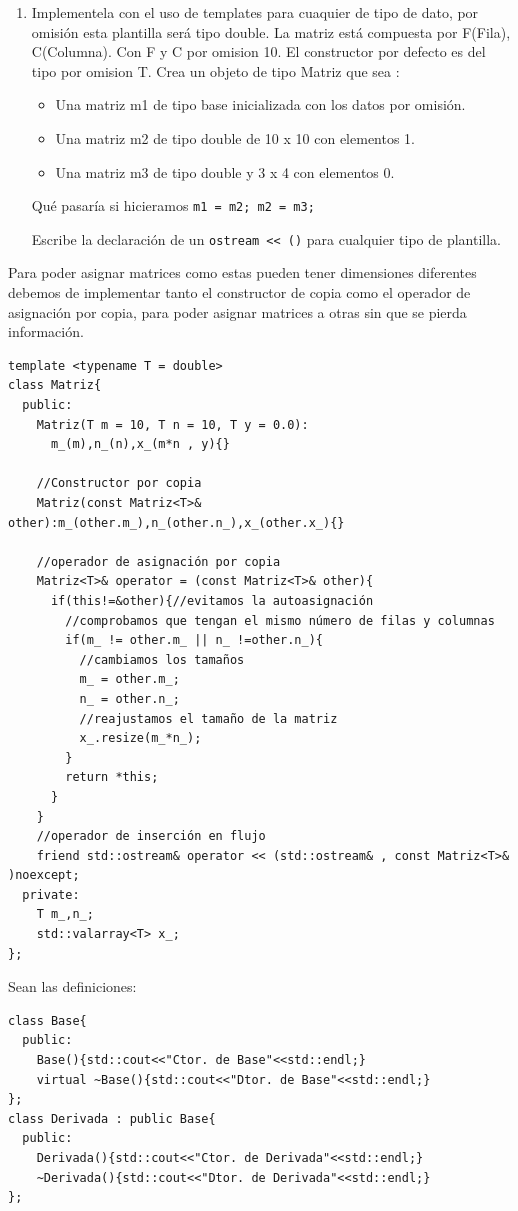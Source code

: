 \begin{enumerate}
  \item Implementela con el uso de templates para cuaquier de tipo de dato, por omisión esta plantilla será tipo double. La matriz está compuesta por F(Fila), C(Columna). Con F y C por omision 10. El constructor por defecto es del tipo por omision T. Crea un objeto de tipo Matriz que sea :
  \begin{itemize}
    \item Una matriz m1 de tipo base inicializada con los datos por omisión.
    \item Una matriz m2 de tipo double de 10 x 10 con elementos 1.
    \item Una matriz m3 de tipo double y 3 x 4 con elementos 0.
  \end{itemize}
  Qué pasaría si hicieramos \texttt{m1 = m2; m2 = m3; }

  Escribe la declaración de un \texttt{ostream << ()} para cualquier tipo de plantilla.
\end{enumerate} 

Para poder asignar matrices como estas pueden tener dimensiones diferentes debemos de implementar tanto el constructor de copia como el operador de asignación por copia, para poder asignar matrices a otras sin que se pierda información.

\begin{verbatim}
template <typename T = double>
class Matriz{
  public:
    Matriz(T m = 10, T n = 10, T y = 0.0):
      m_(m),n_(n),x_(m*n , y){}
 
    //Constructor por copia
    Matriz(const Matriz<T>& other):m_(other.m_),n_(other.n_),x_(other.x_){}

    //operador de asignación por copia
    Matriz<T>& operator = (const Matriz<T>& other){
      if(this!=&other){//evitamos la autoasignación
        //comprobamos que tengan el mismo número de filas y columnas
        if(m_ != other.m_ || n_ !=other.n_){
          //cambiamos los tamaños
          m_ = other.m_;
          n_ = other.n_;
          //reajustamos el tamaño de la matriz
          x_.resize(m_*n_);
        }
        return *this;
      }
    }
    //operador de inserción en flujo
    friend std::ostream& operator << (std::ostream& , const Matriz<T>& )noexcept;
  private:
    T m_,n_;
    std::valarray<T> x_;
};

\end{verbatim}

 Sean las definiciones:
\begin{center}
 \begin{lstlisting}[frame = single]
class Base{
  public:
    Base(){std::cout<<"Ctor. de Base"<<std::endl;}
    virtual ~Base(){std::cout<<"Dtor. de Base"<<std::endl;}
};
class Derivada : public Base{
  public:
    Derivada(){std::cout<<"Ctor. de Derivada"<<std::endl;}
    ~Derivada(){std::cout<<"Dtor. de Derivada"<<std::endl;}
};  
 \end{lstlisting} 
\end{center}

